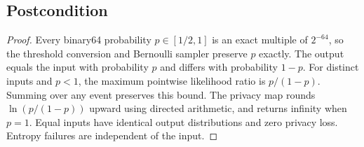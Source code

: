 \documentclass{article}
\begin{document}
\subsection*{Postcondition}
\begin{theorem}
\end{theorem}
\begin{proof}
    Every binary64 probability $p\in[1/2,1]$ is an exact multiple of $2^{-64}$,
    so the threshold conversion and Bernoulli sampler preserve $p$ exactly.
    The output equals the input with probability $p$ and differs with probability $1-p$.
    For distinct inputs and $p<1$, the maximum pointwise likelihood ratio is $p/(1-p)$.
    Summing over any event preserves this bound.
    The privacy map rounds $\ln(p/(1-p))$ upward using directed arithmetic,
    and returns infinity when $p=1$.
    Equal inputs have identical output distributions and zero privacy loss.
    Entropy failures are independent of the input.
\end{proof}




\end{document}
